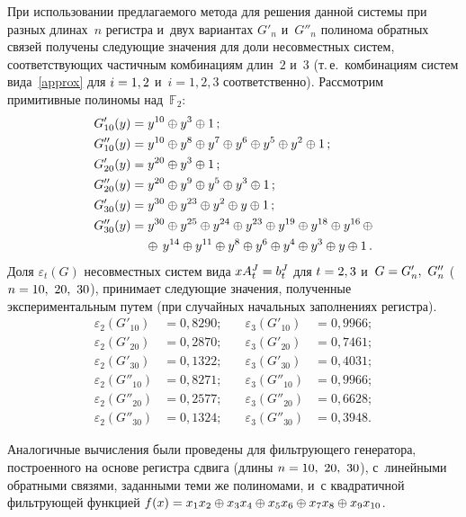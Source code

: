 \begin{multicols}{2}
При использовании предлагаемого метода для решения данной системы при разных 
длинах~$n$ регистра и~двух вариантах $G'_n$ и~$G''_n$ полинома обратных связей 
получены следующие значения для доли несовместных систем, соответствующих 
частичным комбинациям длин~$2$ и~$3$ (т.\,е.\ комбинациям систем 
вида~\eqref{approx} для $i\hm=1, 2$ и~$i=1, 2, 3$ соответственно).
Рассмотрим примитивные полиномы над~$\mathbb{F}_2$:
\begin{align*}
  G'_{10}(y)&= y^{10}\oplus y^3\oplus 1\,;\\
  G''_{10}(y)&= y^{10}\oplus y^8\oplus y^7\oplus y^6\oplus y^5\oplus y^2\oplus 
1\,;\\
  G'_{20}(y)&= y^{20}\oplus y^3\oplus 1\,;\\
  G''_{20}(y)&= y^{20}\oplus y^9\oplus y^5\oplus y^3\oplus 1\,;\\
  G'_{30}(y)&= y^{30}\oplus y^{23}\oplus y^2\oplus y\oplus 1\,;\\
  G''_{30}(y)&= y^{30}\oplus y^{25}\oplus y^{24}\oplus y^{23}\oplus 
y^{19}\oplus y^{18}\oplus y^{16}\,\oplus\\
&\hspace*{4mm}\oplus\, y^{14}\oplus y^{11}\oplus y^8\oplus y^6\oplus y^4\oplus y^3\oplus 
y\oplus 1\,.
\end{align*}
Доля $\varepsilon_t(G)$ несовместных систем вида $xA^{J}_t\hm=b^{J}_t$ для $t\hm=2, 3$ 
и~$G\hm=G'_n,\ G''_n$ ($n\hm=10,\ 20,\ 30$), принимает следующие значения, полученные 
экспериментальным путем (при случайных начальных заполнениях регистра).
\begin{alignat*}{2}
    \varepsilon_2\left(G'_{10}\right)&= 0{,}8290; &\quad \varepsilon_3\left(G'_{10}\right)&= 0{,}9966;  \\
    \varepsilon_2\left(G'_{20}\right)&= 0{,}2870; &\quad \varepsilon_3\left(G'_{20}\right)&= 0{,}7461;  \\
    \varepsilon_2\left(G'_{30}\right)&= 0{,}1322; &\quad \varepsilon_3\left(G'_{30}\right)&= 0{,}4031;  \\
    \varepsilon_2\left(G''_{10}\right)&= 0{,}8271; &\quad \varepsilon_3\left(G''_{10}\right)&= 0{,}9966; \\
    \varepsilon_2\left(G''_{20}\right)&= 0{,}2577; &\quad \varepsilon_3\left(G''_{20}\right)&= 0{,}6628; \\
    \varepsilon_2\left(G''_{30}\right)&= 0{,}1324; &\quad \varepsilon_3\left(G''_{30}\right)&= 0{,}3948. 
\end{alignat*}

Аналогичные вычисления были проведены для фильтрующего генератора, построенного 
на основе регистра сдвига (длины $n\hm = 10,\ 20,\ 30$), с~линейными обратными 
связями, заданными теми же полиномами, и~с квадратичной фильтрующей функцией 
$f(x)\hm=x_1x_2\oplus x_3x_4\oplus x_5x_6\oplus x_7x_8\oplus x_9x_{10}$.


\end{multicols}
